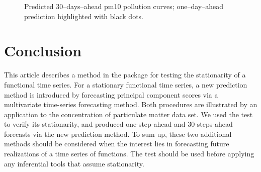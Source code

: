 \documentclass[nojss]{jss}
\begin{document}
\begin{figure}[!htbp]
\centering
{}\quad
{}
\caption{Predicted 30--days--ahead pm10 pollution curves; one--day--ahead prediction highlighted with black dots.}\label{f:pm10}
\end{figure}

\section{Conclusion}\label{sec:4}

This article describes a method in the  package for testing the stationarity of a functional time series. For a stationary functional time series, a new prediction method is introduced by forecasting principal component scores via a multivariate time-series forecasting method. Both procedures are illustrated by an application to the concentration of particulate matter data set. We used the test to verify its stationarity, and produced one-step-ahead and 30-steps-ahead forecasts via the new prediction method. To sum up, these two additional methods should be considered when the interest lies in forecasting future realizations of a time series of functions. The test should be used before applying any inferential tools that assume stationarity.




\end{document}
